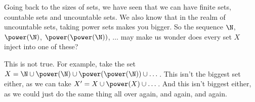 \documentclass[a4paper]{scrartcl}
\begin{document}
Going back to the sizes of sets, we have seen that we can have finite sets, countable sets and uncountable sets. We also know that in the realm of uncountable sets, taking power sets makes you bigger. So the sequence $\N$, $\power(\N)$, $\power(\power(\N))$, $\dots$ may make us wonder does every set $X$ inject into one of these?

This is not true. For example, take the set $X = \N \cup \power(\N) \cup \power(\power(\N)) \cup \dots$. This isn't the biggest set either, as we can take $X' = X \cup \power(X) \cup \dots$. And this isn't biggest either, as we could just do the same thing all over again, and again, and again.




	




\end{document}
